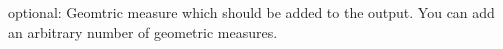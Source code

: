 optional\+: Geomtric measure which should be added to the output. You can add an arbitrary number of geometric measures. 